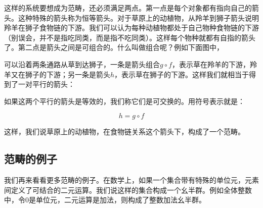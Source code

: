 \documentclass{article}
\begin{document}
这样的系统要想成为范畴，还必须满足两点。第一点是每个对象都有指向自己的箭头。这种特殊的箭头称为恒等箭头。对于草原上的动植物，从羚羊到狮子箭头说明羚羊在狮子食物链的下游。我们可以认为每种动植物都处于自己物种食物链的下游（别误会，并不是指吃同类，而是指不吃同类）。这样每个物种就都有自指的箭头了。第二点是箭头之间是可组合的。什么叫做组合呢？例如下面图中，

\begin{center}
\end{center}

可以沿着两条通路从草到达狮子，一条是箭头组合$g \circ f$，表示草在羚羊的下游，羚羊又在狮子的下游；另一条是箭头$h$，表示草在狮子的下游。这样我们就相当于得到了一对平行的箭头：

\begin{center}
\end{center}

如果这两个平行的箭头是等效的，我们称它们是可交换的。用符号表示就是：

\[
h = g \circ f
\]

这样，我们说草原上的动植物，在食物链关系这个箭头下，构成了一个范畴。

\subsection{范畴的例子}

我们再来看看更多范畴的例子。在数学上，如果一个集合带有特殊的单位元，元素间定义了可结合的二元运算。我们说这样的集合构成一个幺半群。例如全体整数中，令0是单位元，二元运算是加法，则构成了整数加法幺半群。
\end{document}
